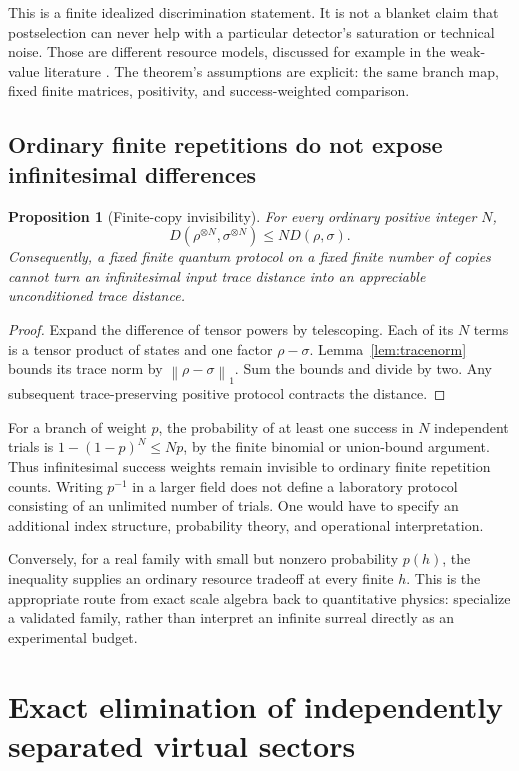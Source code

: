 \documentclass[11pt,oneside]{article}
\numberwithin{equation}{section}
\theoremstyle{plain}
\newtheorem{proposition}[theorem]{Proposition}
\theoremstyle{definition}
\theoremstyle{remark}
\newcommand{\norm}[1]{\left\|#1\right\|}
\begin{document}
This is a finite idealized discrimination statement. It is not a blanket claim that postselection can never help with a particular detector's saturation or technical noise. Those are different resource models, discussed for example in the weak-value literature \cite{FerrieCombes,JordanEtAl}. The theorem's assumptions are explicit: the same branch map, fixed finite matrices, positivity, and success-weighted comparison.

\subsection{Ordinary finite repetitions do not expose infinitesimal differences}
\begin{proposition}[Finite-copy invisibility]\label{prop:copies}
For every ordinary positive integer $N$,
\[
 D(\rho^{\otimes N},\sigma^{\otimes N})\le N D(\rho,\sigma).
\]
Consequently, a fixed finite quantum protocol on a fixed finite number of copies cannot turn an infinitesimal input trace distance into an appreciable unconditioned trace distance.
\end{proposition}
\begin{proof}
Expand the difference of tensor powers by telescoping. Each of its $N$ terms is a tensor product of states and one factor $\rho-\sigma$. Lemma~\ref{lem:tracenorm} bounds its trace norm by $\norm{\rho-\sigma}_1$. Sum the bounds and divide by two. Any subsequent trace-preserving positive protocol contracts the distance.
\end{proof}

For a branch of weight $p$, the probability of at least one success in $N$ independent trials is $1-(1-p)^N\le Np$, by the finite binomial or union-bound argument. Thus infinitesimal success weights remain invisible to ordinary finite repetition counts. Writing $p^{-1}$ in a larger field does not define a laboratory protocol consisting of an unlimited number of trials. One would have to specify an additional index structure, probability theory, and operational interpretation.

Conversely, for a real family with small but nonzero probability $p(h)$, the inequality supplies an ordinary resource tradeoff at every finite $h$. This is the appropriate route from exact scale algebra back to quantitative physics: specialize a validated family, rather than interpret an infinite surreal directly as an experimental budget.

\section{Exact elimination of independently separated virtual sectors}\label{sec:elimination}
\end{document}
